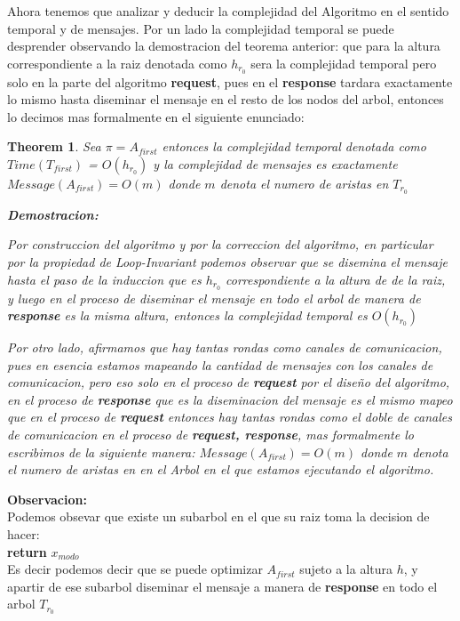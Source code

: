 \documentclass[11pt]{article}
\newtheorem{theorem}{Theorem}
\begin{document}
    Ahora tenemos que analizar y deducir la complejidad del Algoritmo en el sentido temporal y de mensajes.
    Por un lado la complejidad temporal se puede desprender observando la demostracion del teorema anterior:
    que para la altura correspondiente a la raiz denotada como $h_ {r_{0}}$ sera la complejidad temporal pero solo en
    la parte del algoritmo \textbf{request}, pues en el \textbf{response} tardara exactamente lo mismo hasta diseminar
    el mensaje en el resto de los nodos del arbol, entonces lo decimos mas formalmente en el siguiente enunciado:

\begin{theorem}
    Sea $\pi = A_{first}$ entonces la complejidad temporal denotada como $Time(T_{first})$ = $O(h_{r_{0}})$
    y la complejidad de mensajes es exactamente $Message(A_{first}) = O(m)$ donde $m$ denota el numero de aristas
    en $T_{r_{0}}$


   \textbf{Demostracion:}
\begin{flushleft}
    Por construccion del algoritmo y por la correccion del algoritmo, en particular por la propiedad de Loop-Invariant
    podemos observar que se disemina el mensaje hasta el paso de la induccion que es $h_{r_{0}}$ correspondiente a la altura de
    de la raiz, y luego en el proceso de diseminar el mensaje en todo el arbol de manera de \textbf{response}
    es la misma altura, entonces la complejidad temporal es $O(h_{r_{0}})$

    Por otro lado, afirmamos que hay tantas rondas como canales de comunicacion, pues en esencia estamos mapeando
    la cantidad de mensajes con los canales de comunicacion, pero eso solo en el proceso de \textbf{request} por el diseño del
    algoritmo, en el proceso de \textbf{response} que es la diseminacion del mensaje es el mismo mapeo que en el proceso
    de \textbf{request} entonces hay tantas rondas como el doble de canales de comunicacion en el proceso de \textbf{request, response},
    mas formalmente lo escribimos de la siguiente manera:
    $Message(A_{first}) = O(m)$ donde $m$ denota el numero de aristas en en el Arbol en el que estamos ejecutando el algoritmo.

\end{flushleft}
\end{theorem}

    \textbf{Observacion:}\\
    Podemos obsevar que existe un subarbol en el que su raiz toma la decision de hacer:\\
    \textbf{return} $x_{modo}$\\
    Es decir podemos decir que se puede optimizar $A_{first}$ sujeto a la altura $h$, y apartir de ese subarbol diseminar
    el mensaje a manera de \textbf{response} en todo el arbol $T_{r_{0}}$
\end{document}
